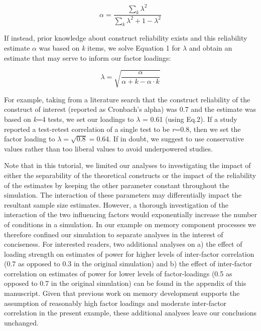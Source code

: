 \documentclass[
  man,floatsintext]{apa6}
\begin{document}
\begin{equation} 
  \alpha = \frac {\sum_{k}{ \lambda^2}}{\sum_{k}{\lambda^2 + 1  - \lambda^2 }}
\end{equation}

If instead, prior knowledge about construct reliability exists and this reliability estimate \(\alpha\) was based on \emph{k} items, we solve Equation 1 for \(\lambda\) and obtain an estimate that may serve to inform our factor loadings:

\begin{equation} 
  \lambda = \sqrt {\frac {\alpha}{\alpha + k  - \alpha \cdot k }}
\end{equation}

For example, taking from a literature search that the construct reliability of the construct of interest (reported as Cronbach's alpha) was 0.7 and the estimate was based on \emph{k}=4 tests, we set our loadings to \(\lambda\) = 0.61 (using Eq.2). If a study reported a test-retest correlation of a single test to be \emph{r}=0.8, then we set the factor loading to \(\lambda = \sqrt{0.8} = 0.64\). If in doubt, we suggest to use conservative values rather than too liberal values to avoid underpowered studies.

Note that in this tutorial, we limited our analyses to investigating the impact of either the separability of the theoretical constructs or the impact of the reliability of the estimates by keeping the other parameter constant throughout the simulation. The interaction of these parameters may differentially impact the resultant sample size estimates. However, a thorough investigation of the interaction of the two influencing factors would exponentially increase the number of conditions in a simulation. In our example on memory component processes we therefore confined our simulation to separate analyses in the interest of conciseness. For interested readers, two additional analyses on a) the effect of loading strength on estimates of power for higher levels of inter-factor correlation (0.7 as opposed to 0.3 in the original simulation) and b) the effect of inter-factor correlation on estimates of power for lower levels of factor-loadings (0.5 as opposed to 0.7 in the original simulation) can be found in the appendix of this manuscript. Given that previous work on memory development supports the assumption of reasonably high factor loadings and moderate inter-factor correlation in the present example, these additional analyses leave our conclusions unchanged.
\end{document}
